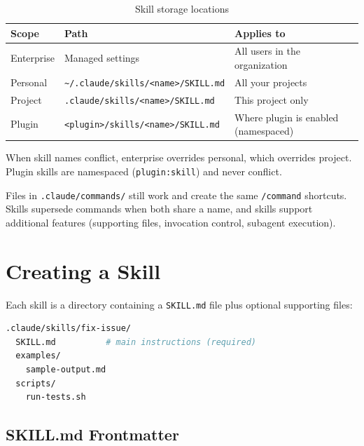 
\begin{table}[ht]
\centering
\caption{Skill storage locations}
\label{tab:skill-scopes}
\begin{tabularx}{\textwidth}{llX}
\toprule
\textbf{Scope} & \textbf{Path} & \textbf{Applies to} \\
\midrule
Enterprise & Managed settings & All users in the organization \\
Personal   & \texttt{\textasciitilde/.claude/skills/<name>/SKILL.md}
           & All your projects \\
Project    & \texttt{.claude/skills/<name>/SKILL.md}
           & This project only \\
Plugin     & \texttt{<plugin>/skills/<name>/SKILL.md}
           & Where plugin is enabled (namespaced) \\
\bottomrule
\end{tabularx}
\end{table}

When skill names conflict, enterprise overrides personal, which overrides
project. Plugin skills are namespaced (\texttt{plugin:skill}) and never
conflict.

\begin{notebox}
Files in \texttt{.claude/commands/} still work and create the same
\texttt{/command} shortcuts. Skills supersede commands when both share a name,
and skills support additional features (supporting files, invocation control,
subagent execution).
\end{notebox}

\section{Creating a Skill}
\label{sec:skill-create}


Each skill is a directory containing a \texttt{SKILL.md} file plus optional
supporting files:

\begin{lstlisting}[language=bash,caption={Skill directory structure}]
.claude/skills/fix-issue/
  SKILL.md          # main instructions (required)
  examples/
    sample-output.md
  scripts/
    run-tests.sh
\end{lstlisting}

\subsection{SKILL.md Frontmatter}

